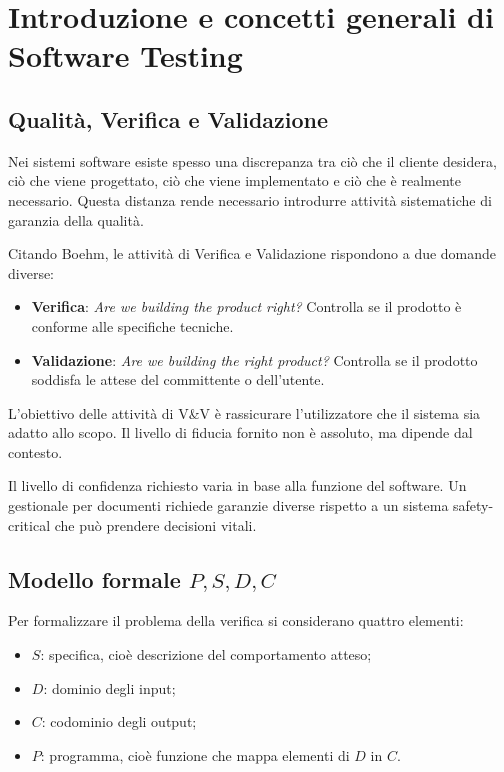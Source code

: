 \chapter{Introduzione e concetti generali di Software Testing}

\section{Qualità, Verifica e Validazione}

Nei sistemi software esiste spesso una discrepanza tra ciò che il cliente desidera, ciò che viene progettato, ciò che viene implementato e ciò che è realmente necessario. Questa distanza rende necessario introdurre attività sistematiche di garanzia della qualità.


Citando Boehm, le attività di Verifica e Validazione rispondono a due domande diverse:

\begin{itemize}
    \item \textbf{Verifica}: \emph{Are we building the product right?}
    Controlla se il prodotto è conforme alle specifiche tecniche.

    \item \textbf{Validazione}: \emph{Are we building the right product?}
    Controlla se il prodotto soddisfa le attese del committente o dell'utente.
\end{itemize}

L'obiettivo delle attività di V\&V è rassicurare l'utilizzatore che il sistema sia adatto allo scopo. Il livello di fiducia fornito non è assoluto, ma dipende dal contesto.

\begin{notaprof}
Il livello di confidenza richiesto varia in base alla funzione del software. Un gestionale per documenti richiede garanzie diverse rispetto a un sistema safety-critical che può prendere decisioni vitali.
\end{notaprof}

\section{Modello formale \(P, S, D, C\)}

Per formalizzare il problema della verifica si considerano quattro elementi:

\begin{itemize}
    \item \textbf{\(S\)}: specifica, cioè descrizione del comportamento atteso;
    \item \textbf{\(D\)}: dominio degli input;
    \item \textbf{\(C\)}: codominio degli output;
    \item \textbf{\(P\)}: programma, cioè funzione che mappa elementi di \(D\) in \(C\).
\end{itemize}

